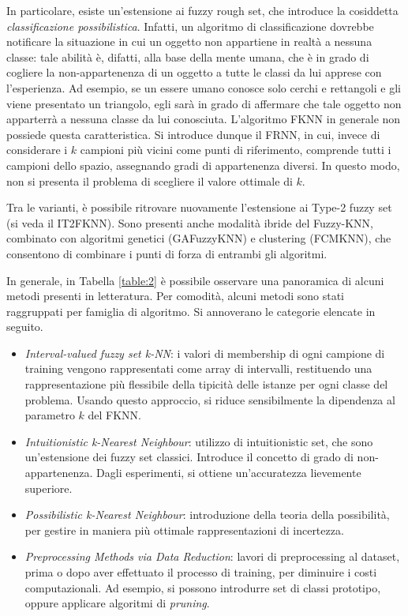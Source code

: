 \documentclass[11pt,  oneside, openany]{book}
\begin{document}
In particolare, esiste un'estensione ai fuzzy rough set, che introduce la cosiddetta \textit{classificazione possibilistica}. Infatti, un algoritmo di classificazione dovrebbe notificare la situazione in cui un oggetto non appartiene in realtà a nessuna classe: tale abilità è, difatti, alla base della mente umana, che è in grado di cogliere la non-appartenenza di un oggetto a tutte le classi da lui apprese con l'esperienza. Ad esempio, se un essere umano conosce solo cerchi e rettangoli e gli viene presentato un triangolo, egli sarà in grado di affermare che tale oggetto non apparterrà a nessuna classe da lui conosciuta. L'algoritmo FKNN in generale non possiede questa caratteristica. Si introduce dunque il FRNN, in cui, invece di considerare i $k$ campioni più vicini come punti di riferimento, comprende tutti i campioni dello spazio, assegnando gradi di appartenenza diversi. In questo modo, non si presenta il problema di scegliere il valore ottimale di $k$. 

Tra le varianti, è possibile ritrovare nuovamente l'estensione ai Type-2 fuzzy set (si veda il IT2FKNN). Sono presenti anche modalità ibride del Fuzzy-KNN, combinato con algoritmi genetici (GAFuzzyKNN) e clustering (FCMKNN), che consentono di combinare i punti di forza di entrambi gli algoritmi. 

In generale, in Tabella \ref{table:2} è possibile osservare una panoramica di alcuni metodi presenti in letteratura. Per comodità, alcuni metodi sono stati raggruppati per famiglia di algoritmo. Si annoverano le categorie elencate in seguito. 

\begin{itemize}
\item \textit{Interval-valued fuzzy set k-NN}: i valori di membership di ogni campione di training vengono rappresentati come array di intervalli, restituendo una rappresentazione più flessibile della tipicità delle istanze per ogni classe del problema. Usando questo approccio, si riduce sensibilmente la dipendenza al parametro $k$ del FKNN. 
\item \textit{Intuitionistic k-Nearest Neighbour}: utilizzo di intuitionistic set, che sono un'estensione dei fuzzy set classici. Introduce il concetto di grado di non-appartenenza. Dagli esperimenti, si ottiene un'accuratezza lievemente superiore. 
\item \textit{Possibilistic k-Nearest Neighbour}: introduzione della teoria della possibilità, per gestire in maniera più ottimale rappresentazioni di incertezza. 
\item \textit{Preprocessing Methods via Data Reduction}: lavori di preprocessing al dataset, prima o dopo aver effettuato il processo di training, per diminuire i costi computazionali. Ad esempio, si possono introdurre set di classi prototipo, oppure applicare algoritmi di \textit{pruning}.
\end{itemize}
\end{document}
